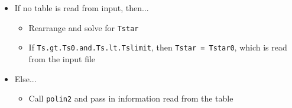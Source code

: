 \begin{description}
{\begin{itemize}
\item{If no table is read from input, then...}
	\begin{itemize}
		\item{Rearrange  and solve for \texttt{Tstar}}
		\item{If \texttt{Ts.gt.Ts0.and.Ts.lt.Tslimit}, then \texttt{Tstar = Tstar0}, which is read from the input file}
	\end{itemize}
			
\item{Else...}
	\begin{itemize}
		\item{Call \texttt{polin2} and pass in information read from the table}
	\end{itemize}

\end{itemize}
}

\end{description}